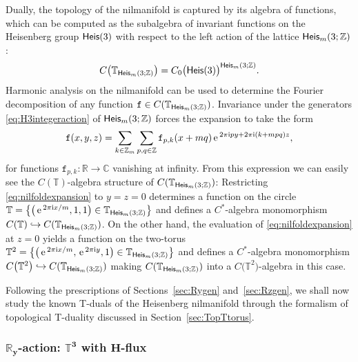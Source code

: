 \documentclass[pdftex]{sigma}
\numberwithin{equation}{section}
\newcommand{\Z}{\zed}
\def\ii{{{\rm i}}}
\newcommand{\Heis}{{\sf Heis}}
\newcommand{\complex}{{\mathbb C}} %
\newcommand{\zed}{{\mathbb Z}} %
\newcommand{\real}{{\mathbb R}} %
\newcommand{\torus}{{\mathbb T}} %
\def\e{{\,\rm e}\,}
\begin{document}
Dually, the topology of the nilmanifold is captured by its algebra of
functions, which can be computed as the subalgebra of invariant
functions on the
Heisenberg group $\Heis(3)$ with respect to the left action of the
lattice $\Heis_m(3;\Z)$:
\[
C\big(\torus_{\Heis_m(3;\Z)}\big) =
C_0\big(\Heis(3)\big)^{\Heis_m(3;\Z)} .
\]
Harmonic analysis on the nilmanifold can be used to determine the
Fourier decomposition of any function $\mathtt{f}\in
C(\torus_{\Heis_m(3;\Z)})$. Invariance under the generators
\eqref{eq:H3integeraction} of $\Heis_m(3;\Z)$ forces the expansion to take the form
\begin{gather}\label{eq:nilfoldexpansion}
\mathtt{f}(x,y,z) = \sum_{k\in\Z_m} \sum_{p,q\in\Z} \mathtt{f}_{p,k}(x+m q)
\e^{2\pi\ii p y +2\pi\ii (k+m p q) z} ,
\end{gather}
for functions $\mathtt{f}_{p,k}\colon \real\to\complex$ vanishing at
infinity. From this expression we can easily see the
$C(\torus)$-algebra structure of $C(\torus_{\Heis_m(3;\Z)})$: Restricting \eqref{eq:nilfoldexpansion} to $y=z=0$
determines a function on the circle $\torus=\big\{\big(\e^{2\pi\ii x/m},1,1\big)\in\torus_{\Heis_m(3;\Z)}\big\}$ and defines a $C^*$-algebra monomorphism
$C(\torus)\hookrightarrow C(\torus_{\Heis_m(3;\Z)})$. On the other hand, the evaluation
of \eqref{eq:nilfoldexpansion} at $z=0$ yields a function on the
two-torus $\torus^2=\big\{\big(\e^{2\pi\ii x/m},\e^{2\pi\ii
 y},1\big)\in\torus_{\Heis_m(3;\Z)}\big\}$ and defines a
$C^*$-algebra monomorphism $C\big(\torus^2\big)\hookrightarrow
C(\torus_{\Heis_m(3;\Z)})$ making $C(\torus_{\Heis_m(3;\Z)})$ into a
 $C\big(\torus^2\big)$-algebra in this case.

Following the prescriptions of Sections~\ref{sec:Rygen} and~\ref{sec:Rzgen}, we shall now study the
known T-duals of the Heisenberg nilmanifold
through the formalism of topological T-duality discussed
in Section~\ref{sec:TopTtorus}.

\subsubsection*{$\boldsymbol{\real_y}$-action: $\boldsymbol{\torus^3}$ with $\boldsymbol{H}$-flux}
\end{document}
